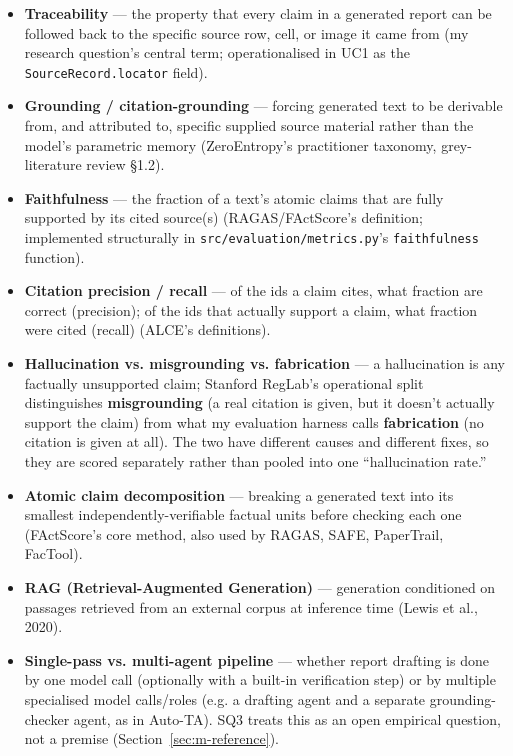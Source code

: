 \begin{itemize}
\item \textbf{Traceability} — the property that every claim in a generated report can be followed back to the specific source row, cell, or image it came from (my research question's central term; operationalised in UC1 as the \texttt{SourceRecord.locator} field).
\item \textbf{Grounding / citation-grounding} — forcing generated text to be derivable from, and attributed to, specific supplied source material rather than the model's parametric memory (ZeroEntropy's practitioner taxonomy, grey-literature review \S1.2).
\item \textbf{Faithfulness} — the fraction of a text's atomic claims that are fully supported by its cited source(s) (RAGAS/FActScore's definition; implemented structurally in \texttt{src/evaluation/metrics.py}'s \texttt{faithfulness} function).
\item \textbf{Citation precision / recall} — of the ids a claim cites, what fraction are correct (precision); of the ids that actually support a claim, what fraction were cited (recall) (ALCE's definitions).
\item \textbf{Hallucination vs. misgrounding vs. fabrication} — a hallucination is any factually unsupported claim; Stanford RegLab's operational split distinguishes \textbf{misgrounding} (a real citation is given, but it doesn't actually support the claim) from what my evaluation harness calls \textbf{fabrication} (no citation is given at all). The two have different causes and different fixes, so they are scored separately rather than pooled into one \textquotedblleft{}hallucination rate.\textquotedblright{}
\item \textbf{Atomic claim decomposition} — breaking a generated text into its smallest independently-verifiable factual units before checking each one (FActScore's core method, also used by RAGAS, SAFE, PaperTrail, FacTool).
\item \textbf{RAG (Retrieval-Augmented Generation)} — generation conditioned on passages retrieved from an external corpus at inference time (Lewis et al., 2020).
\item \textbf{Single-pass vs. multi-agent pipeline} — whether report drafting is done by one model call (optionally with a built-in verification step) or by multiple specialised model calls/roles (e.g. a drafting agent and a separate grounding-checker agent, as in Auto-TA). SQ3 treats this as an open empirical question, not a premise (Section~\ref{sec:m-reference}).

\end{itemize}
